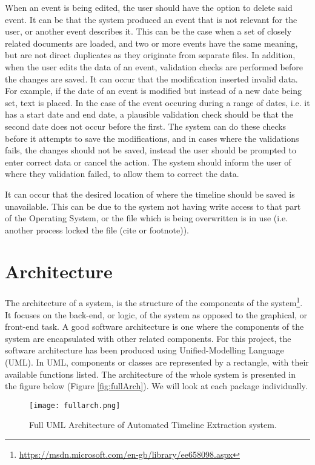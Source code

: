 \par When an event is being edited, the user should have the option to delete said event. It can be that the system produced an event that is not relevant for the user, or another event describes it. This can be the case when a set of closely related documents are loaded, and two or more events have the same meaning, but are not direct duplicates as they originate from separate files. In addition, when the user edits the data of an event, validation checks are performed before the changes are saved. It can occur that the modification inserted invalid data. For example, if the date of an event is modified but instead of a new date being set, text is placed. In the case of the event occuring during a range of dates, i.e. it has a start date and end date, a plausible validation check should be that the second date does not occur before the first. The system can do these checks before it attempts to save the modifications, and in cases where the validations fails, the changes should not be saved, instead the user should be prompted to enter correct data or cancel the action. The system should inform the user of where they validation failed, to allow them to correct the data.
\par It can occur that the desired location of where the timeline should be saved is unavailable. This can be due to the system not having write access to that part of the Operating System, or the file which is being overwritten is in use (i.e. another process locked the file (cite or footnote)).
\section{Architecture}
\par The architecture of a system, is the structure of the components of the system\footnote{\url{https://msdn.microsoft.com/en-gb/library/ee658098.aspx}}. It focuses on the back-end, or logic, of the system as opposed to the graphical, or front-end task. A good software architecture is one where the components of the system are encapsulated with other related components. For this project, the software architecture has been produced using Unified-Modelling Language (UML). In UML, components or classes are represented by a rectangle, with their available functions listed. The architecture of the whole system is presented in the figure below (Figure \ref{fig:fullArch}). We will look at each package individually.
\begin{figure}[H]
\caption{Full UML Architecture of Automated Timeline Extraction system.}
\label{fig: fullArch}
\texttt{[image: fullarch.png]}
\centering
\end{figure}
